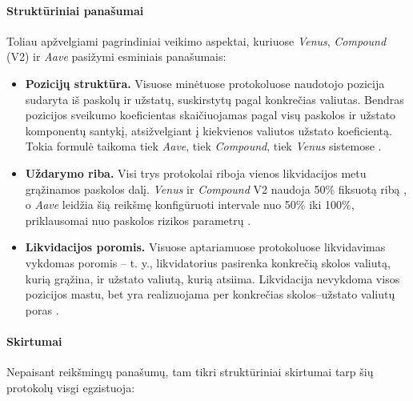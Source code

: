 \documentclass[]{VUMIFTemplateClass}
\begin{document}

\paragraph{Struktūriniai panašumai} Toliau apžvelgiami pagrindiniai veikimo aspektai, kuriuose \textit{Venus}, \textit{Compound} (V2) ir \textit{Aave} pasižymi esminiais panašumais:

\begin{itemize}
    \item \textbf{Pozicijų struktūra.} Visuose minėtuose protokoluose naudotojo pozicija sudaryta iš paskolų ir užstatų, suskirstytų pagal konkrečias valiutas. Bendras pozicijos sveikumo koeficientas skaičiuojamas pagal visų paskolos ir užstato komponentų santykį, atsižvelgiant į kiekvienos valiutos užstato koeficientą. Tokia formulė taikoma tiek \textit{Aave}, tiek \textit{Compound}, tiek \textit{Venus} sistemose \cite{aave-risks, compound-positionstructure}.

    \item \textbf{Uždarymo riba.} Visi trys protokolai riboja vienos likvidacijos metu grąžinamos paskolos dalį. \textit{Venus} ir \textit{Compound} V2 naudoja 50\% fiksuotą ribą \cite{compound-closefactor}, o \textit{Aave} leidžia šią reikšmę konfigūruoti intervale nuo 50\% iki 100\%, priklausomai nuo paskolos rizikos parametrų \cite{aave-liquidation}.

    \item \textbf{Likvidacijos poromis.} Visuose aptariamuose protokoluose likvidavimas vykdomas poromis – t. y., likvidatorius pasirenka konkrečią skolos valiutą, kurią grąžina, ir užstato valiutą, kurią atsiima. Likvidacija nevykdoma visos pozicijos mastu, bet yra realizuojama per konkrečias skolos–užstato valiutų poras \cite{compound-liquidation, aave-liquidation}.
\end{itemize}

\paragraph{Skirtumai} Nepaisant reikšmingų panašumų, tam tikri struktūriniai skirtumai tarp šių protokolų visgi egzistuoja:
\end{document}
